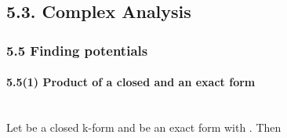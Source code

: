 \hrulefill


\subsection{ 5.3. Complex Analysis }




\subsubsection{5.5 Finding potentials}


\paragraph{5.5(1) Product of a closed and an exact form}\ \\
Let \ieq{\kappa} be a closed k-form and \ieq{\varepsilon} be an exact form with \ieq{\d\tilde\varepsilon=\varepsilon}. Then

